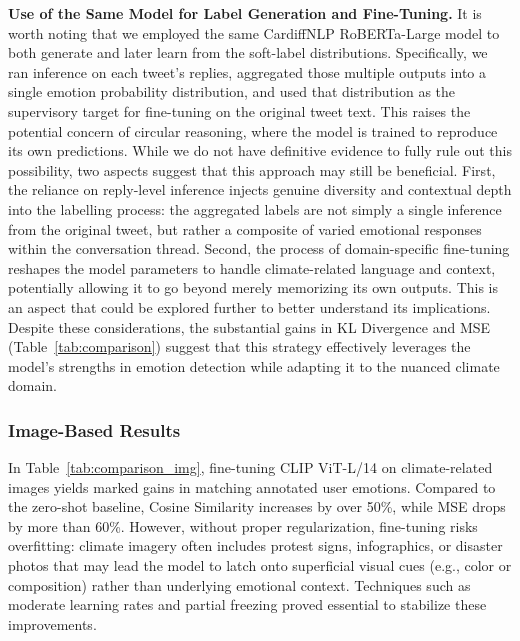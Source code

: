 \textbf{Use of the Same Model for Label Generation and Fine-Tuning.}
It is worth noting that we employed the same CardiffNLP RoBERTa-Large model to both generate and later learn from the soft-label distributions. Specifically, we ran inference on each tweet’s replies, aggregated those multiple outputs into a single emotion probability distribution, and used that distribution as the supervisory target for fine-tuning on the original tweet text. This raises the potential concern of circular reasoning, where the model is trained to reproduce its own predictions. While we do not have definitive evidence to fully rule out this possibility, two aspects suggest that this approach may still be beneficial. First, the reliance on reply-level inference injects genuine diversity and contextual depth into the labelling process: the aggregated labels are not simply a single inference from the original tweet, but rather a composite of varied emotional responses within the conversation thread. Second, the process of domain-specific fine-tuning reshapes the model parameters to handle climate-related language and context, potentially allowing it to go beyond merely memorizing its own outputs. This is an aspect that could be explored further to better understand its implications. Despite these considerations, the substantial gains in KL Divergence and MSE (Table~\ref{tab:comparison}) suggest that this strategy effectively leverages the model’s strengths in emotion detection while adapting it to the nuanced climate domain.

\subsubsection*{Image-Based Results}
In Table~\ref{tab:comparison_img}, fine-tuning CLIP ViT-L/14 on climate-related images yields marked gains in matching annotated user emotions. Compared to the zero-shot baseline, Cosine Similarity increases by over 50\%, while MSE drops by more than 60\%. However, without proper regularization, fine-tuning risks overfitting: climate imagery often includes protest signs, infographics, or disaster photos that may lead the model to latch onto superficial visual cues (e.g., color or composition) rather than underlying emotional context. Techniques such as moderate learning rates and partial freezing proved essential to stabilize these improvements.

